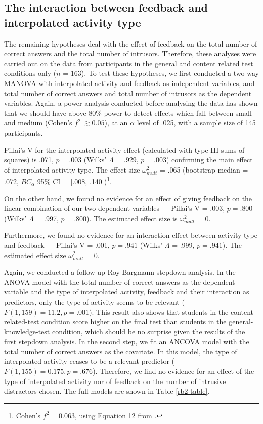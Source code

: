 \hypertarget{the-interaction-between-feedback-and-interpolated-activity-type}{%
\subsection{The interaction between feedback and interpolated activity
type}\label{the-interaction-between-feedback-and-interpolated-activity-type}}

The remaining hypotheses deal with the effect of feedback on the total
number of correct answers and the total number of intrusors. Therefore,
these analyses were carried out on the data from participants in the
general and content related test conditions only (\(n\) = 163). To test
these hypotheses, we first conducted a two-way MANOVA with interpolated
activity and feedback as independent variables, and total number of
correct answers and total number of intrusors as the dependent
variables. Again, a power analysis conducted before analysing the data
has shown that we should have above 80\% power to detect effects which
fall between small and medium (Cohen's \(f^2\ \gtrsim 0.05\)), at an
\(\alpha\) level of .025, with a sample size of 145 participants.

Pillai's V for the interpolated activity effect (calculated with type
III sums of squares) is .071, \(p = .003\) (Wilks' \(\Lambda\) = .929,
\(p = .003\)) confirming the main effect of interpolated activity type.
The effect size \(\omega^2_{mult}\) = .065 (bootstrap median = .072,
\(BC_\alpha\) 95\% CI = {[}.008, .140{]})\footnote{
Cohen's \(f^2 = 0.063\), using Equation 12 from
\citet{steynjrEstimatingEffectSize2009}.
}.

On the other hand, we found no evidence for an effect of giving feedback
on the linear combination of our two dependent variables --- Pillai's V
= .003, \(p = .800\) (Wilks' \(\Lambda\) = .997, \(p = .800\)). The
estimated effect size is \(\omega^2_{mult}\) = 0.

Furthermore, we found no evidence for an interaction effect between
activity type and feedback --- Pillai's V = .001, \(p = .941\) (Wilks'
\(\Lambda\) = .999, \(p = .941\)). The estimated effect size
\(\omega^2_{mult}\) = 0.

Again, we conducted a follow-up Roy-Bargmann stepdown analysis. In the
ANOVA model with the total number of correct answers as the dependent
variable and the type of interpolated activity, feedback and their
interaction as predictors, only the type of activity seems to be
relevant (\(F(1, 159) = 11.2, p = .001\)). This result also shows that
students in the content-related-test condition score higher on the final
test than students in the general-knowledge-test condition, which should
be no surprise given the results of the first stepdown analysis. In the
second step, we fit an ANCOVA model with the total number of correct
answers as the covariate. In this model, the type of interpolated
activity ceases to be a relevant predictor
(\(F(1, 155) = 0.175, p = .676\)). Therefore, we find no evidence for an
effect of the type of interpolated activity nor of feedback on the
number of intrusive distractors chosen. The full models are shown in
Table \ref{rb2-table}.

